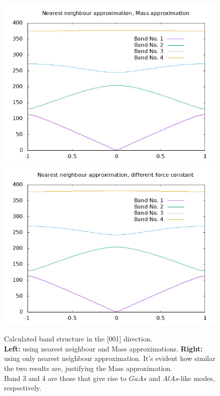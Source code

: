 \documentclass{article}
\begin{document}
\begin{figure}[ht]
	\centering
	\includegraphics[scale=0.3]{same.jpeg}
	\includegraphics[scale=0.3]{different.jpeg}
	\caption{Calculated band structure in the [001] direction.\\ \textbf{Left:} using nearest neighbour and Mass approximations. \textbf{Right:} using only nearest neighbour approximation. It's evident how similar the two results are, justifying the Mass approximation.\\
	Band 3 and 4 are those that give rise to $GaAs$ and $AlAs$-like modes, respectively.}
	\label{fig:nearest}
\end{figure}
\end{document}
